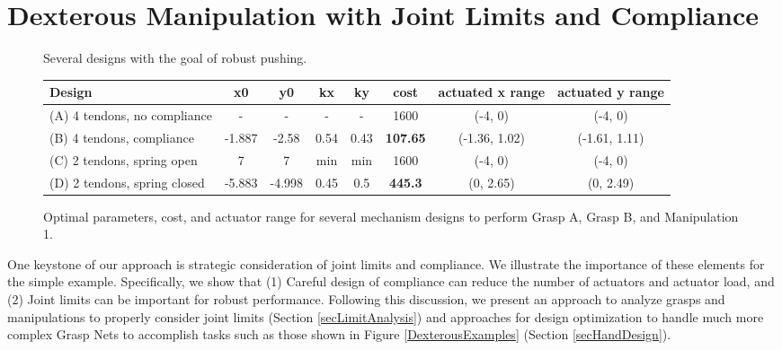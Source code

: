 \section{Dexterous Manipulation with Joint Limits and Compliance}
  \label{secManipAnalysis}

\begin{figure}
\begin{center}
\vspace*{2in}
\end{center}
\caption[]{Several designs with the goal of robust pushing.}
\label{PushExample}
\end{figure}

\begin{figure}
\begin{center}
\begin{tabular}{l|c|c|c|c|c|c|c|}
Design & x0 & y0 & kx & ky & cost &	actuated x range &	actuated y range \\ \hline
(A) 4 tendons, no compliance&	-&	-&	-&	-&	1600	&(-4, 0)	&(-4, 0)\\
(B) 4 tendons, compliance	&-1.887	&-2.58	&0.54&	0.43&	{\bf 107.65} &	(-1.36, 1.02)	&(-1.61, 1.11) \\
(C) 2 tendons, spring open&	7	&7	&min	&min	&1600	&(-4, 0)	&(-4, 0)\\
(D) 2 tendons, spring closed&	-5.883&	-4.998&	0.45&	0.5	& {\bf 445.3}  &	(0, 2.65)&	(0, 2.49)
\end{tabular}
\end{center}
\caption{Optimal parameters, cost, and actuator range for several mechanism designs to perform Grasp A, Grasp B, and Manipulation 1.}
\label{ComplianceAnalysis}
\end{figure}

One keystone of our approach is strategic consideration of joint limits and compliance.  We illustrate the importance of these elements for the simple example.  Specifically, we show that (1) Careful design of compliance can reduce the number of actuators and actuator load, and (2) Joint limits can be important for robust performance.   Following this discussion, we present an approach to analyze grasps and manipulations to properly consider joint limits (Section \ref{secLimitAnalysis}) and approaches for design optimization to handle much more complex Grasp Nets to accomplish tasks such as those shown in Figure \ref{DexterousExamples} (Section \ref{secHandDesign}).

